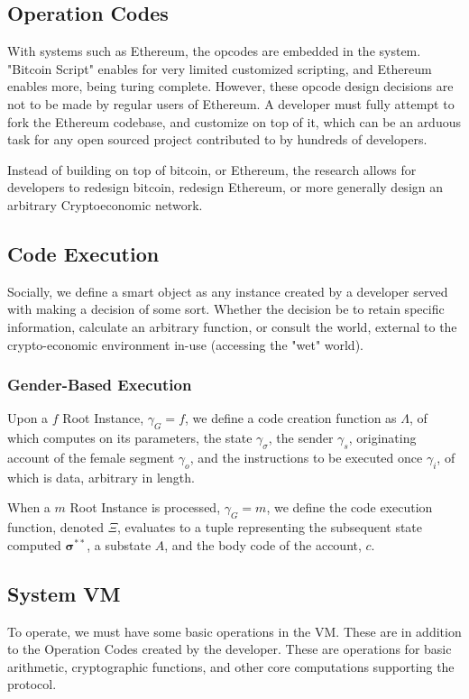 \documentclass[12pt, titlepage, twocolumn]{report}
\begin{document}
 
\subsection{Operation Codes}
With systems such as Ethereum, the opcodes are embedded in the system. "Bitcoin Script" enables for very limited customized scripting, and Ethereum enables more, being turing complete. However, these opcode design decisions are not to be made by regular users of Ethereum. A developer must fully attempt to fork the Ethereum codebase, and customize on top of it, which can be an arduous task for any open sourced project contributed to by hundreds of developers. 

Instead of building on top of bitcoin, or Ethereum, the research allows for developers to redesign bitcoin, redesign Ethereum, or more generally design an arbitrary Cryptoeconomic network.

\subsection{Code Execution}
Socially, we define a smart object as any instance created by a developer served with making a decision of some sort. Whether the decision be to retain specific information, calculate an arbitrary function, or consult the world, external to the crypto-economic environment in-use (accessing the "wet" world).

\subsubsection{Gender-Based Execution}
Upon a \( f \) Root Instance, \( \gamma_{G} = f \), we define a code creation function as \( \Lambda \), of which computes on its parameters, the state \( \gamma_{\sigma} \), the sender \( \gamma_{s} \), originating account of the female segment \( \gamma_{o} \), and the instructions to be executed once \( \gamma_{i} \), of which is data, arbitrary in length.


When a \(m\) Root Instance is processed, \(\gamma_{G} = m\), we define the code execution function, denoted \( \Xi \), evaluates to a tuple representing the subsequent state computed \( \boldsymbol{\sigma}^{**} \), a substate \(A\), and the body code of the account, \(c\).



\subsection{System VM}
To operate, we must have some basic operations in the VM. These are in addition to the Operation Codes created by the developer. These are operations for basic arithmetic, cryptographic functions, and other core computations supporting the protocol.
\end{document}
